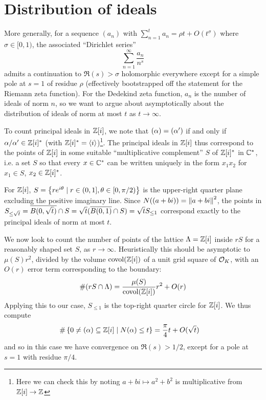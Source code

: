 \documentclass[11pt]{article}
\begin{document}
\section{Distribution of ideals}
More generally, for a sequence $(a_n)$ with $\sum_{n = 1}^t a_n = \rho t + O(t^\sigma)$ where $\sigma \in [0, 1)$, the associated ``Dirichlet series''
$$
    \sum_{n = 1}^\infty \frac{a_n}{n^s}
$$
admits a continuation to $\Re(s) > \sigma$ holomorphic everywhere except for a simple pole at $s = 1$ of residue $\rho$ (effectively bootstrapped off the statement for the Riemann zeta function). For the Dedekind zeta function, $a_n$ is the number of ideals of norm $n$, so we want to argue about asymptotically about the distribution of ideals of norm at most $t$ as $t \to \infty$.

To count principal ideals in $\mathbb{Z}[i]$, we note that $(\alpha) = (\alpha')$ if and only if $\alpha/\alpha' \in \mathbb{Z}[i]^*$ (with $\mathbb{Z}[i]^* = \left\langle i \right\rangle$)\footnote{Here we can check this by noting $a + bi \mapsto a^2 + b^2$ is multiplicative from $\mathbb{Z}[i] \to \mathbb{Z}$}. The principal ideals in $\mathbb{Z}[i]$ thus correspond to the points of $\mathbb{Z}[i]$ in some suitable ``multiplicative complement'' $S$ of $\mathbb{Z}[i]^*$ in $\mathbb{C}^*$, i.e. a set $S$ so that every $x \in \mathbb{C}^*$ can be written uniquely in the form $x_1x_2$ for $x_1 \in S$, $x_2 \in \mathbb{Z}[i]^*$. 

For $\mathbb{Z}[i]$, $S = \left\{  re^{i\theta} \mid r \in (0, 1], \theta \in [0, \pi/2)  \right\}$ is the upper-right quarter plane excluding the positive imaginary line. Since $N(\left(  a + bi  \right)) = \left\| a + bi \right\|^2$, the points in $S_{\leq \sqrt{t}} = \overline{B(0, \sqrt{t})} \cap S = \sqrt{t}(\overline{B(0, 1)} \cap S) = \sqrt{t}S_{\leq 1}$ correspond exactly to the principal ideals of norm at most $t$. 

We now look to count the number of points of the lattice $\Lambda = \mathbb{Z}[i]$ inside $rS$ for a reasonably shaped set $S$, as $r \to \infty$. Heuristically this should be asymptotic to $\mu(S)r^2$, divided by the volume $\operatorname{covol}(\mathbb{Z}[i])$ of a unit grid square of $\mathcal{O}_K$, with an $O(r)$ error term corresponding to the boundary:
$$
    \#(rS \cap \Lambda) = \frac{\mu(S)}{\operatorname{covol}(\mathbb{Z}[i])}r^2 + O(r)
$$
Applying this to our case, $S_{\leq 1}$ is the top-right quarter circle for $\mathbb{Z}[i]$. We thus compute
\begin{align*}
    \#\left\{  0 \neq (\alpha) \subseteq \mathbb{Z}[i] \mid N(\alpha) \leq t  \right\} &= \frac{\pi}{4}t + O(\sqrt{t})
\end{align*}
and so in this case we have convergence on $\Re(s) > 1/2$, except for a pole at $s = 1$ with residue $\pi/4$.
\end{document}
